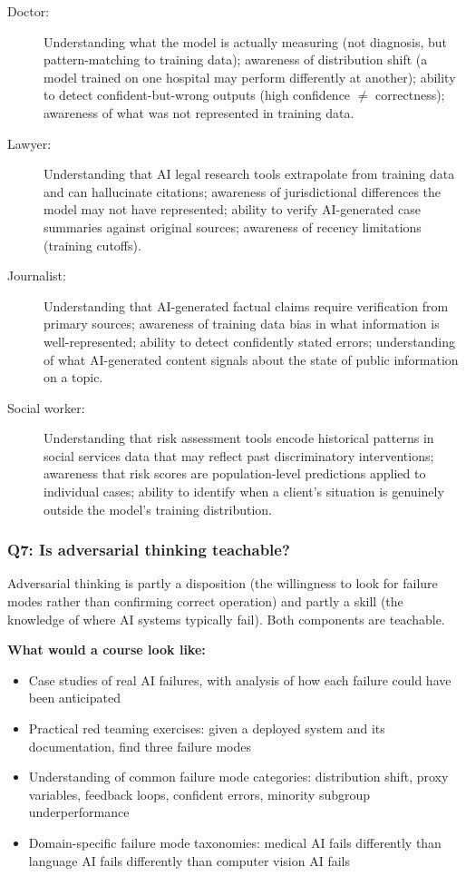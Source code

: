 \begin{description}
    \item[Doctor:] Understanding what the model is actually measuring (not diagnosis, but pattern-matching to training data); awareness of distribution shift (a model trained on one hospital may perform differently at another); ability to detect confident-but-wrong outputs (high confidence $\neq$ correctness); awareness of what was not represented in training data.

    \item[Lawyer:] Understanding that AI legal research tools extrapolate from training data and can hallucinate citations; awareness of jurisdictional differences the model may not have represented; ability to verify AI-generated case summaries against original sources; awareness of recency limitations (training cutoffs).

    \item[Journalist:] Understanding that AI-generated factual claims require verification from primary sources; awareness of training data bias in what information is well-represented; ability to detect confidently stated errors; understanding of what AI-generated content signals about the state of public information on a topic.

    \item[Social worker:] Understanding that risk assessment tools encode historical patterns in social services data that may reflect past discriminatory interventions; awareness that risk scores are population-level predictions applied to individual cases; ability to identify when a client's situation is genuinely outside the model's training distribution.
\end{description}

\subsubsection*{Q7: Is adversarial thinking teachable?}

Adversarial thinking is partly a disposition (the willingness to look for failure modes rather than confirming correct operation) and partly a skill (the knowledge of where AI systems typically fail). Both components are teachable.

\textbf{What would a course look like:}
\begin{itemize}
    \item Case studies of real AI failures, with analysis of how each failure could have been anticipated
    \item Practical red teaming exercises: given a deployed system and its documentation, find three failure modes
    \item Understanding of common failure mode categories: distribution shift, proxy variables, feedback loops, confident errors, minority subgroup underperformance
    \item Domain-specific failure mode taxonomies: medical AI fails differently than language AI fails differently than computer vision AI fails
\end{itemize}

